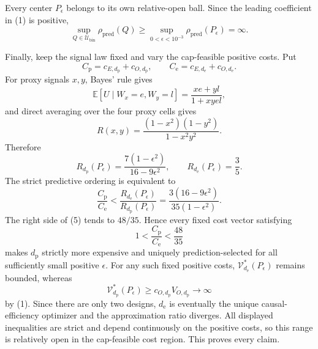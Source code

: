 Every center \(P_\epsilon\) belongs to its own relative-open ball.  Since the leading coefficient in (1) is positive,
\[
 \sup_{Q\in\mathcal U_{\mathrm{bin}}}\rho_{\mathrm{pred}}(Q)
 \ge \sup_{0<\epsilon<10^{-3}}\rho_{\mathrm{pred}}(P_\epsilon)
 =\infty. \tag{4}
\]

Finally, keep the signal law fixed and vary the cap-feasible positive costs.  Put
\[
 C_{\mathrm p}=c_{E,d_{\mathrm p}}+c_{O,d_{\mathrm p}},
 \qquad
 C_{\mathrm e}=c_{E,d_{\mathrm e}}+c_{O,d_{\mathrm e}}.
\]
For proxy signals \(x,y\), Bayes' rule gives
\[
 \mathbb E[U\mid W_x=e,W_y=l]=\frac{xe+yl}{1+xyel},
\]
and direct averaging over the four proxy cells gives
\[
 R(x,y)=\frac{(1-x^2)(1-y^2)}{1-x^2y^2}.
\]
Therefore
\[
 R_{d_{\mathrm p}}(P_\epsilon)
 =\frac{7(1-\epsilon^2)}{16-9\epsilon^2},
 \qquad
 R_{d_{\mathrm e}}(P_\epsilon)=\frac35.
\]
The strict predictive ordering is equivalent to
\[
 \frac{C_{\mathrm p}}{C_{\mathrm e}}
 <\frac{R_{d_{\mathrm e}}(P_\epsilon)}{R_{d_{\mathrm p}}(P_\epsilon)}
 =\frac{3(16-9\epsilon^2)}{35(1-\epsilon^2)}. \tag{5}
\]
The right side of (5) tends to \(48/35\).  Hence every fixed cost vector satisfying
\[
 1<\frac{C_{\mathrm p}}{C_{\mathrm e}}<\frac{48}{35}
\]
makes \(d_{\mathrm p}\) strictly more expensive and uniquely prediction-selected for all sufficiently small positive \(\epsilon\).  For any such fixed positive costs, \(\mathcal V_{d_{\mathrm e}}^*(P_\epsilon)\) remains bounded, whereas
\[
 \mathcal V_{d_{\mathrm p}}^*(P_\epsilon)
 \ge c_{O,d_{\mathrm p}}V_{O,d_{\mathrm p}}\longrightarrow\infty
\]
by (1).  Since there are only two designs, \(d_{\mathrm e}\) is eventually the unique causal-efficiency optimizer and the approximation ratio diverges.  All displayed inequalities are strict and depend continuously on the positive costs, so this range is relatively open in the cap-feasible cost region.  This proves every claim.